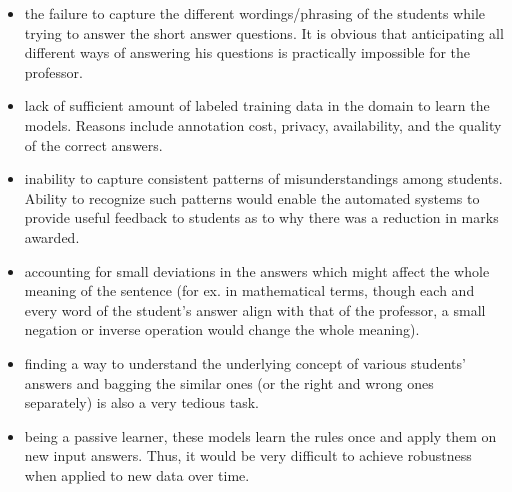 \begin{itemize}
	
	\item the failure to capture the different wordings/phrasing of the students while trying to answer the short answer questions. It is obvious that anticipating all different ways of answering his questions is practically impossible for the professor. 
	
	\item lack of sufficient amount of labeled training data in the domain to learn the models. Reasons include annotation cost, privacy, availability, and the quality of the correct answers. 
	
	\item inability to capture consistent patterns of misunderstandings among students. Ability to recognize such patterns would enable the automated systems to provide useful feedback to students as to why there was a reduction in marks awarded.
	
	\item accounting for small deviations in the answers which might affect the whole meaning of the sentence (for ex. in mathematical terms, though each and every word of the student's answer align with that of the professor, a small negation or inverse operation would change the whole meaning).
	
	\item finding a way to understand the underlying concept of various students' answers and bagging the similar ones (or the right and wrong ones separately) is also a very tedious task. 
	
	\item being a passive learner, these models learn the rules once and apply them on new input answers. Thus, it would be very difficult to achieve robustness when applied to new data over time. \\
	
\end{itemize}








